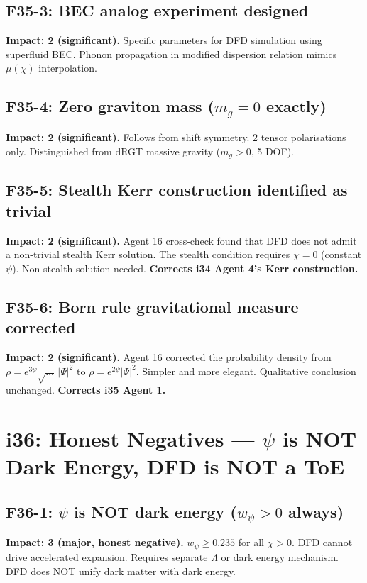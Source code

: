 \documentclass[11pt,a4paper]{article}
\begin{document}
\subsection{F35-3: BEC analog experiment designed}
\textbf{Impact: 2 (significant).} Specific parameters for DFD simulation using superfluid BEC. Phonon propagation in modified dispersion relation mimics $\mu(\chi)$ interpolation.

\subsection{F35-4: Zero graviton mass ($m_g = 0$ exactly)}
\textbf{Impact: 2 (significant).} Follows from shift symmetry. 2 tensor polarisations only. Distinguished from dRGT massive gravity ($m_g > 0$, 5 DOF).

\subsection{F35-5: Stealth Kerr construction identified as trivial}
\textbf{Impact: 2 (significant).} Agent 16 cross-check found that DFD does not admit a non-trivial stealth Kerr solution. The stealth condition requires $\chi = 0$ (constant $\psi$). Non-stealth solution needed. \textbf{Corrects i34 Agent 4's Kerr construction.}

\subsection{F35-6: Born rule gravitational measure corrected}
\textbf{Impact: 2 (significant).} Agent 16 corrected the probability density from $\rho = e^{3\psi}\sqrt{\ldots}\,|\Psi|^2$ to $\rho = e^{2\psi}|\Psi|^2$. Simpler and more elegant. Qualitative conclusion unchanged. \textbf{Corrects i35 Agent 1.}

\section{i36: Honest Negatives --- $\psi$ is NOT Dark Energy, DFD is NOT a ToE}
\label{sec:i36}

\subsection{F36-1: $\psi$ is NOT dark energy ($w_\psi > 0$ always)}
\textbf{Impact: 3 (major, honest negative).} $w_\psi \geq 0.235$ for all $\chi > 0$. DFD cannot drive accelerated expansion. Requires separate $\Lambda$ or dark energy mechanism. DFD does NOT unify dark matter with dark energy.
\end{document}

